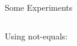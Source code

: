 \documentclass[aspectratio=169,compress,10pt]{beamer}
\begin{document}
\begin{frame}[t]{Some Experiments}
     {
        
    }
     {
        \begin{columns}
            \begin{column}{0.45\textwidth}
                Using not-equals:
                
            \end{column}
            \begin{column}{0.45\textwidth}
            \end{column}
        \end{columns}
    }


\end{frame}
\end{document}
